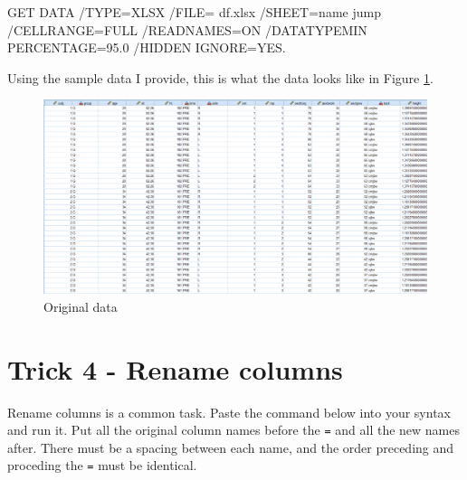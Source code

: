 \documentclass[
]{book}
\newenvironment{Shaded}{\begin{snugshade}}{\end{snugshade}}
\newcommand{\FloatTok}[1]{\textcolor[rgb]{0.00,0.00,0.81}{#1}}
\newcommand{\NormalTok}[1]{#1}
\newcommand{\OtherTok}[1]{\textcolor[rgb]{0.56,0.35,0.01}{#1}}
\newcommand{\SpecialCharTok}[1]{\textcolor[rgb]{0.00,0.00,0.00}{#1}}
\newcommand{\StringTok}[1]{\textcolor[rgb]{0.31,0.60,0.02}{#1}}
\begin{document}
\begin{Shaded}
\begin{Highlighting}[]
\NormalTok{GET DATA}
  \SpecialCharTok{/}\NormalTok{TYPE}\OtherTok{=}\NormalTok{XLSX}
  \SpecialCharTok{/}\NormalTok{FILE}\OtherTok{=} \StringTok{\textquotesingle{}df.xlsx\textquotesingle{}}
  \SpecialCharTok{/}\NormalTok{SHEET}\OtherTok{=}\NormalTok{name }\StringTok{\textquotesingle{}jump\textquotesingle{}}
  \SpecialCharTok{/}\NormalTok{CELLRANGE}\OtherTok{=}\NormalTok{FULL}
  \SpecialCharTok{/}\NormalTok{READNAMES}\OtherTok{=}\NormalTok{ON}
  \SpecialCharTok{/}\NormalTok{DATATYPEMIN PERCENTAGE}\OtherTok{=}\FloatTok{95.0}
  \SpecialCharTok{/}\NormalTok{HIDDEN IGNORE}\OtherTok{=}\NormalTok{YES.}
\end{Highlighting}
\end{Shaded}

Using the sample data I provide, this is what the data looks like in Figure \ref{fig:original}.

\begin{figure}
\includegraphics[width=1\linewidth]{images/original_data} \caption{Original data}\label{fig:original}
\end{figure}

\hypertarget{trick-4---rename-columns}{%
\chapter*{Trick 4 - Rename columns}\label{trick-4---rename-columns}}

Rename columns is a common task. Paste the command below into your syntax and run it. Put all the original column names before the \texttt{=} and all the new names after. There must be a spacing between each name, and the order preceding and proceding the \texttt{=} must be identical.
\end{document}
